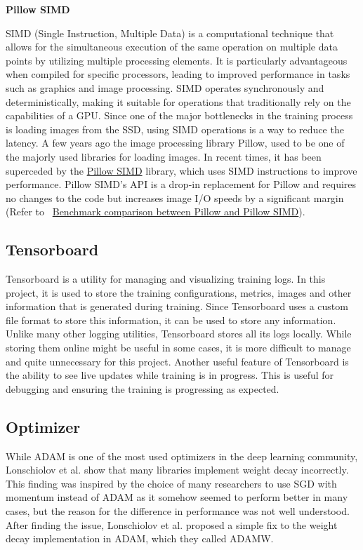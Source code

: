 \textbf{Pillow SIMD}

SIMD (Single Instruction, Multiple Data) is a computational technique that allows for the simultaneous execution of the same operation on multiple data points by utilizing multiple processing elements. It is particularly advantageous when compiled for specific processors, leading to improved performance in tasks such as graphics and image processing. SIMD operates synchronously and deterministically, making it suitable for operations that traditionally rely on the capabilities of a GPU. Since one of the major bottlenecks in the training process is loading images from the SSD, using SIMD operations is a way to reduce the latency. A few years ago the image processing library Pillow, used to be one of the majorly used libraries for loading images. In recent times, it has been superceded by the \href{https://github.com/uploadcare/pillow-simd}{Pillow SIMD} library, which uses SIMD instructions to improve performance. Pillow SIMD's API is a drop-in replacement for Pillow and requires no changes to the code but increases image I/O speeds by a significant margin (Refer to ~\href{https://python-pillow.org/pillow-perf/}{Benchmark comparison between Pillow and Pillow SIMD}).

\subsection{Tensorboard}
Tensorboard is a utility for managing and visualizing training logs. In this project, it is used to store the training configurations, metrics, images and other information that is generated during training. Since Tensorboard uses a custom file format to store this information, it can be used to store any information. Unlike many other logging utilities, Tensorboard stores all its logs locally. While storing them online might be useful in some cases, it is more difficult to manage and quite unnecessary for this project.
Another useful feature of Tensorboard is the ability to see live updates while training is in progress. This is useful for debugging and ensuring the training is progressing as expected.

\subsection{Optimizer}
While ADAM \cite{kingmaAdamMethodStochastic2014} is one of the most used optimizers in the deep learning community, Lonschiolov et al. \cite{loshchilovDecoupledWeightDecay2019} show that many libraries implement weight decay incorrectly. This finding was inspired by the choice of many researchers to use SGD with momentum instead of ADAM as it somehow seemed to perform better in many cases, but the reason for the difference in performance was not well understood. After finding the issue, Lonschiolov et al. proposed a simple fix to the weight decay implementation in ADAM, which they called ADAMW.

